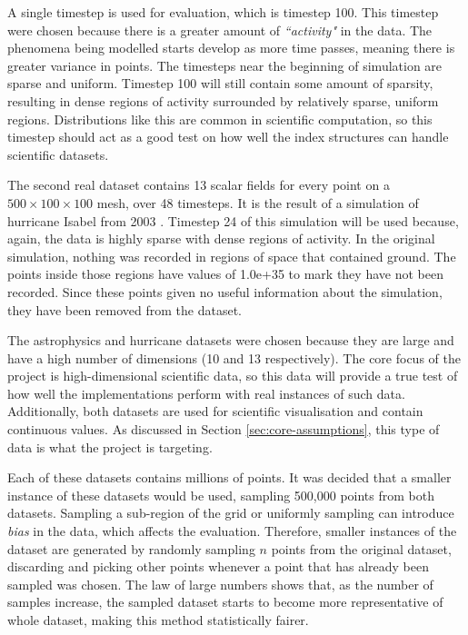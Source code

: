 A single timestep is used for evaluation, which is timestep 100. This timestep were chosen because there is a greater amount of \textit{``activity"} in the data. The phenomena being modelled starts develop as more time passes, meaning there is greater variance in points. The timesteps near the beginning of simulation are sparse and uniform. Timestep 100 will still contain some amount of sparsity, resulting in dense regions of activity surrounded by relatively sparse, uniform regions. Distributions like this are common in scientific computation, so this timestep should act as a good test on how well the index structures can handle scientific datasets.

The second real dataset contains 13 scalar fields for every point on a $500 \times 100 \times 100$ mesh, over 48 timesteps. It is the result of a simulation of hurricane Isabel from 2003 \cite{hurricane-isabel-dataset}. Timestep 24 of this simulation will be used because, again, the data is highly sparse with dense regions of activity. In the original simulation, nothing was recorded in regions of space that contained ground. The points inside those regions have values of 1.0e+35 to mark they have not been recorded. Since these points given no useful information about the simulation, they have been removed from the dataset.

The astrophysics and hurricane datasets were chosen because they are large and have a high number of dimensions (10 and 13 respectively). The core focus of the project is high-dimensional scientific data, so this data will provide a true test of how well the implementations perform with real instances of such data. Additionally, both datasets are used for scientific visualisation and contain continuous values. As discussed in Section \ref{sec:core-assumptions}, this type of data is what the project is targeting.

Each of these datasets contains millions of points. It was decided that a smaller instance of these datasets would be used, sampling 500,000 points from both datasets. Sampling a sub-region of the grid or uniformly sampling can introduce \textit{bias} in the data, which affects the evaluation. Therefore, smaller instances of the dataset are generated by randomly sampling $n$ points from the original dataset, discarding and picking other points whenever a point that has already been sampled was chosen. The law of large numbers \cite{large-sample-theory} shows that, as the number of samples increase, the sampled dataset starts to become more representative of whole dataset, making this method statistically fairer.

